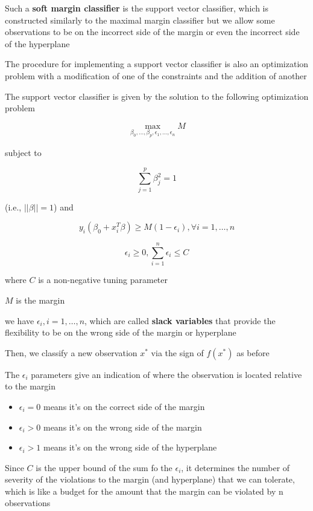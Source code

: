 \documentclass[
]{book}
\begin{document}
Such a \textbf{soft margin classifier} is the support vector classifier, which is constructed similarly to the maximal margin classifier but we allow some observations to be on the incorrect side of the margin or even the incorrect side of the hyperplane

The procedure for implementing a support vector classifier is also an optimization problem with a modification of one of the constraints and the addition of another

The support vector classifier is given by the solution to the following optimization problem

\[
\underset{\beta_0,\dots, \beta_p, \epsilon_1, \dots, \epsilon_n}{\operatorname{max}} M
\]

subject to

\[
\sum_{j=1}^p \beta_j^2 = 1
\]

(i.e., \(||\beta|| = 1\)) and

\[
y_i (\beta_0 + x_i^T \beta) \ge M(1 - \epsilon_i), \forall i = 1, \dots, n
\]

\[
\epsilon_i \ge 0, \sum_{i=1}^n \epsilon_i \le C
\]

where \(C\) is a non-negative tuning parameter

\(M\) is the margin

we have \(\epsilon_i, i = 1, \dots, n\), which are called \textbf{slack variables} that provide the flexibility to be on the wrong side of the margin or hyperplane

Then, we classify a new observation \(x^*\) via the sign of \(f(x^*)\) as before

The \(\epsilon_i\) parameters give an indication of where the observation is located relative to the margin

\begin{itemize}
\item
  \(\epsilon_i = 0\) means it's on the correct side of the margin
\item
  \(\epsilon_i >0\) means it's on the wrong side of the margin
\item
  \(\epsilon_i >1\) means it's on the wrong side of the hyperplane
\end{itemize}

Since \(C\) is the upper bound of the sum fo the \(\epsilon_i\), it determines the number of severity of the violations to the margin (and hyperplane) that we can tolerate, which is like a budget for the amount that the margin can be violated by n observations \citep[p.~376]{james2013}
\end{document}
